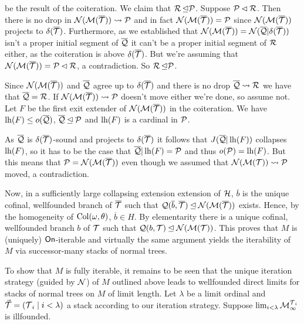 \documentclass[../../main]{subfiles}
\begin{document}
{{    be the result of the coiteration. We claim that
    $\R\init\P$. Suppose $\P\pinit\R$. Then there is no drop in
    $\N(\M(\overline\T))\leadsto\P$ and in fact
    $\N(\M(\overline\T))=\P$ since $\N(\M(\overline\T))$ projects to
    $\delta(\overline\T)$. Furthermore, as we established that
    $\N(\M(\overline\T))=\N(\overline\Q|\delta(\overline\T))$ isn't a
    proper initial segment of $\overline\Q$ it can't be a proper
    initial segment of $\R$ either, as the coiteration is above
    $\delta(\overline\T)$. But we're assuming that
    $\N(\M(\overline\T))=\P\pinit\R$, a contradiction. So $\R\init\P$.
        
    \qquad Since $\N(\M(\overline\T))$ and $\overline\Q$ agree up to
    $\delta(\overline\T)$ and there is no drop $\overline\Q\leadsto\R$
    we have that $\overline\Q=\R$. If $\N(\M(\overline\T))\leadsto\P$
    doesn't move either we're done, so assume not. Let $F$ be the
    first exit extender  of $\N(\M(\overline\T))$ in the
    coiteration. We have $\lh(F) \le o(\overline\Q)$,
    $\overline\Q\init\P$ and $\lh(F)$ is a cardinal in $\P$.
        
    \qquad As $\overline\Q$ is $\delta(\overline\T)$-sound and
    projects to $\delta(\overline\T)$ it follows that
    $J(\overline\Q|\lh(F))$ collapses $\lh(F)$, so it has to be the
    case that $\overline\Q|\lh(F)=\P$ and thus $o(\P)=\lh(F)$. But
    this means that $\P=\N(\M(\overline\T))$ even though we assumed
    that $\N(\M(\T))\leadsto\P$ moved, a contradiction.
    }

  \qquad Now, in a sufficiently large collapsing extension extension
  of $\h$, $\overline b$ is the unique cofinal, wellfounded branch of
  $\overline\T$ such that
  $\Q(\overline b,\overline\T) \init\N(\M(\overline\T))$
  exists. Hence, by the homogeneity of $\col(\omega,\theta)$,
  $\overline b \in H$. By elementarity there is a unique cofinal,
  wellfounded branch $b$ of $\T$ such that $\Q(b,\T)
  \init\N(\M(\T))$. This proves that $M$ is (uniquely) $\on$-iterable
  and virtually the same argument yields the iterability of $M$ via
  successor-many stacks of normal trees.
  
  \qquad To show that $M$ is fully iterable, it remains to be seen
  that the unique iteration strategy (guided by $\N$) of $M$ outlined
  above leads to wellfounded direct limits for stacks of normal trees
  on $M$ of limit length. Let $\lambda$ be a limit ordinal and
  $\vec\T = (\T_i \mid i<\lambda)$ a stack according to our iteration
  strategy. Suppose $\lim_{i<\lambda}\M^{\T_i}_\infty$ is illfounded.
  
}
\end{document}
